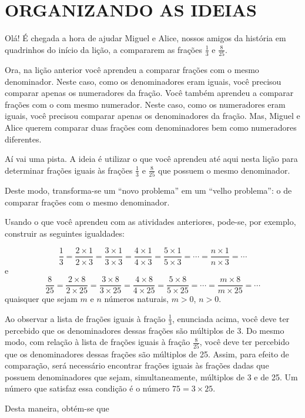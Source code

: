 \section{ORGANIZANDO AS IDEIAS }

Olá! É chegada a hora de ajudar Miguel e Alice, nossos amigos da história em quadrinhos do início da lição, a compararem as frações $\frac{1}{3}$ e $\frac{8}{25}$.

Ora, na lição anterior você aprendeu a comparar frações com o mesmo denominador. Neste caso, como os denominadores eram iguais, você precisou comparar apenas os numeradores da fração. Você também aprendeu a comparar frações com o com mesmo numerador. Neste caso, como os numeradores eram iguais, você precisou comparar apenas os denominadores da fração. Mas, Miguel e Alice querem comparar duas frações com denominadores bem como numeradores diferentes.

Aí vai uma pista.  A ideia é utilizar o que você aprendeu até aqui nesta lição para determinar frações iguais às frações $\frac{1}{3}$ e $\frac{8}{25}$ que possuem o mesmo denominador. 

Deste modo, transforma-se um ``novo problema'' em um ``velho problema'': o de comparar frações com o mesmo denominador.

Usando o que você aprendeu com as atividades anteriores, pode-se, por exemplo, construir as seguintes igualdades:  

$$\dfrac{1}{3} = \dfrac{2 \times 1}{2 \times 3} = \dfrac{3 \times 1}{3 \times 3} = \dfrac{4 \times 1}{4 \times 3} = \dfrac{5 \times 1}{5 \times 3} = \cdots = \dfrac{n \times 1}{n\times 3} = \cdots$$
e
$$\dfrac{8}{25} = \dfrac{2 \times 8}{2 \times 25} = \dfrac{3 \times 8}{3 \times 25} = \dfrac{4 \times 8}{4 \times 25} = \dfrac{5 \times 8}{5 \times 25} = \cdots = \dfrac{m \times 8}{m\times 25} = \cdots$$
quaisquer que sejam $m$ e $n$ números naturais, $m > 0$, $n > 0$.

Ao observar a lista de frações iguais à fração $\frac{1}{3}$, enunciada acima, você deve ter percebido que os denominadores dessas frações são múltiplos de 3.  Do mesmo modo, com relação à lista de frações iguais à fração $\frac{8}{25}$, você deve ter percebido que os denominadores dessas frações são múltiplos de 25. Assim, para efeito de comparação, será necessário encontrar frações iguais às frações dadas que possuem denominadores que sejam, simultaneamente, múltiplos de 3 e de 25. Um número que satisfaz essa condição é o número $75 = 3 \times 25$.

Desta maneira, obtém-se que

